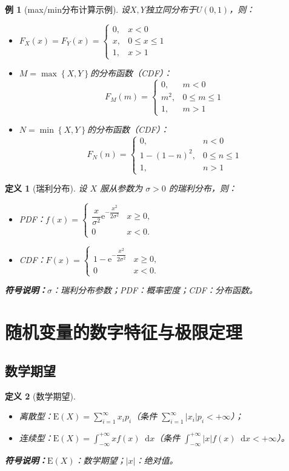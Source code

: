 \documentclass[11pt,a4paper,oneside]{article}
\theoremstyle{yhbthm}
\newtheorem{definition}{定义}[section]
\newtheorem{example}{例}[section]
\newcommand{\E}{\mathrm{E}}
\newcommand{\dif}{\mathop{}\!\mathrm{d}}
\newcommand{\e}{\mathrm{e}}
\newcommand{\symnote}[1]{\par\noindent\textbf{符号说明：}#1\par}
\newcommand{\maxrv}[2]{\max\left\{#1,#2\right\}}
\newcommand{\minrv}[2]{\min\left\{#1,#2\right\}}
\begin{document}
\begin{example}[max/min分布计算示例]
设$X,Y$独立同分布于$U(0,1)$，则：
\begin{itemize}
    \item $F_X(x)=F_Y(x)=\begin{cases}0, & x<0 \\ x, & 0\leq x\leq1 \\ 1, & x>1\end{cases}$

    \item $M=\maxrv{X}{Y}$的分布函数（CDF）：
    $$
    F_M(m)=\begin{cases}0, & m<0 \\ m^2, & 0\leq m\leq1 \\ 1, & m>1\end{cases}
    $$

    \item $N=\minrv{X}{Y}$的分布函数（CDF）：
    $$
    F_N(n)=\begin{cases}0, & n<0 \\ 1-(1-n)^2, & 0\leq n\leq1 \\ 1, & n>1\end{cases}
    $$
\end{itemize}
\end{example}

\begin{definition}[瑞利分布]
设 $X$ 服从参数为 $\sigma > 0$ 的瑞利分布，则：
\begin{itemize}
    \item PDF：$f(x) = \begin{cases}\dfrac{x}{\sigma^2} \e^{-\dfrac{x^2}{2\sigma^2}} & x \ge 0, \\ 0 & x < 0.\end{cases}$
    \item CDF：$F(x) = \begin{cases}1 - \e^{-\dfrac{x^2}{2\sigma^2}} & x \ge 0, \\ 0 & x < 0.\end{cases}$
\end{itemize}
\symnote{$\sigma$：瑞利分布参数；PDF：概率密度；CDF：分布函数。}
\end{definition}

\section{随机变量的数字特征与极限定理}
\subsection{数学期望}
\begin{definition}[数学期望]
\begin{itemize}
    \item 离散型：$\E(X) = \sum_{i=1}^{\infty} x_i p_i$（条件 $\sum_{i=1}^{\infty} |x_i| p_i < +\infty$）；
    \item 连续型：$\E(X) = \int_{-\infty}^{+\infty} x f(x) \dif x$（条件 $\int_{-\infty}^{+\infty} |x| f(x) \dif x < +\infty$）。
\end{itemize}
\symnote{$\E(X)$：数学期望；$|x|$：绝对值。}
\end{definition}
\end{document}
